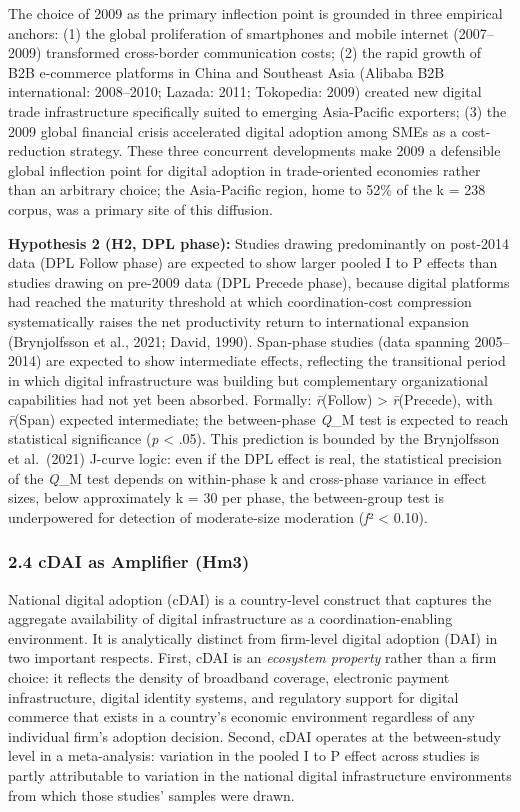 \documentclass[
  12pt,a4paper]{article}
\begin{document}
The choice of 2009 as the primary inflection point is grounded in three
empirical anchors: (1) the global proliferation of smartphones and
mobile internet (2007--2009) transformed cross-border communication
costs; (2) the rapid growth of B2B e-commerce platforms in China and
Southeast Asia (Alibaba B2B international: 2008--2010; Lazada: 2011;
Tokopedia: 2009) created new digital trade infrastructure specifically
suited to emerging Asia-Pacific exporters; (3) the 2009 global financial
crisis accelerated digital adoption among SMEs as a cost-reduction
strategy. These three concurrent developments make 2009 a defensible
global inflection point for digital adoption in trade-oriented economies
rather than an arbitrary choice; the Asia-Pacific region, home to 52\%
of the k = 238 corpus, was a primary site of this diffusion.

\textbf{Hypothesis 2 (H2, DPL phase):} Studies drawing predominantly on
post-2014 data (DPL Follow phase) are expected to show larger pooled I
to P effects than studies drawing on pre-2009 data (DPL Precede phase),
because digital platforms had reached the maturity threshold at which
coordination-cost compression systematically raises the net productivity
return to international expansion (Brynjolfsson et al., 2021; David,
1990). Span-phase studies (data spanning 2005--2014) are expected to
show intermediate effects, reflecting the transitional period in which
digital infrastructure was building but complementary organizational
capabilities had not yet been absorbed. Formally: \emph{r̄}(Follow)
\textgreater{} \emph{r̄}(Precede), with \emph{r̄}(Span) expected
intermediate; the between-phase \emph{Q}\_M test is expected to reach
statistical significance (\emph{p} \textless{} .05). This prediction is
bounded by the Brynjolfsson et al.~(2021) J-curve logic: even if the DPL
effect is real, the statistical precision of the \emph{Q}\_M test
depends on within-phase k and cross-phase variance in effect sizes,
below approximately k = 30 per phase, the between-group test is
underpowered for detection of moderate-size moderation (\emph{f}²
\textless{} 0.10).

\hypertarget{cdai-as-amplifier-hm3}{%
\subsubsection{2.4 cDAI as Amplifier
(Hm3)}\label{cdai-as-amplifier-hm3}}

National digital adoption (cDAI) is a country-level construct that
captures the aggregate availability of digital infrastructure as a
coordination-enabling environment. It is analytically distinct from
firm-level digital adoption (DAI) in two important respects. First, cDAI
is an \emph{ecosystem property} rather than a firm choice: it reflects
the density of broadband coverage, electronic payment infrastructure,
digital identity systems, and regulatory support for digital commerce
that exists in a country's economic environment regardless of any
individual firm's adoption decision. Second, cDAI operates at the
between-study level in a meta-analysis: variation in the pooled I to P
effect across studies is partly attributable to variation in the
national digital infrastructure environments from which those studies'
samples were drawn.
\end{document}
